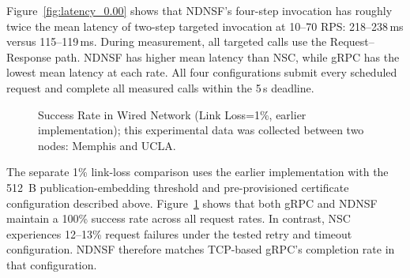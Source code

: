 Figure~\ref{fig:latency_0.00} shows that NDNSF's four-step invocation has roughly twice the mean latency of two-step targeted invocation at 10--70 RPS: 218--238\,ms versus 115--119\,ms. During measurement, all targeted calls use the Request--Response path. NDNSF has higher mean latency than NSC, while gRPC has the lowest mean latency at each rate. All four configurations submit every scheduled request and complete all measured calls within the 5\,s deadline.

\begin{figure}[!h]
  \centering
  \caption{Success Rate in Wired Network (Link Loss=1\%, earlier implementation); this experimental data was collected between two nodes: Memphis and UCLA.}
  \label{fig:success_rate_0.01}
\end{figure}

The separate 1\% link-loss comparison uses the earlier implementation with the 512~B publication-embedding threshold and pre-provisioned certificate configuration described above. Figure~\ref{fig:success_rate_0.01} shows that both gRPC and NDNSF maintain a 100\% success rate across all request rates. In contrast, NSC experiences 12--13\% request failures under the tested retry and timeout configuration. NDNSF therefore matches TCP-based gRPC's completion rate in that configuration.

